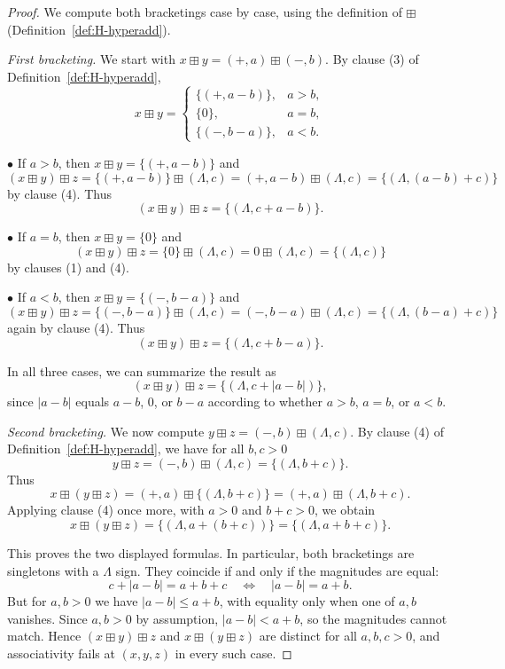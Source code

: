 \documentclass[11pt]{amsart}
\numberwithin{equation}{section}
\theoremstyle{definition}
\theoremstyle{remark}
\newcommand{\op}{\boxplus}                 %
\begin{document}
\begin{proof}
We compute both bracketings case by case, using the definition of $\op$
(Definition~\ref{def:H-hyperadd}).

\medskip\noindent
\emph{First bracketing.}
We start with $x\op y=(+,a)\op(-,b)$.  By clause (3) of
Definition~\ref{def:H-hyperadd},
\[
  x\op y
  =
  \begin{cases}
    \{(+,a-b)\}, & a>b,\\[2pt]
    \{0\},       & a=b,\\[2pt]
    \{(-,b-a)\}, & a<b.
  \end{cases}
\]

\smallskip
\noindent
$\bullet$ If $a>b$, then $x\op y=\{(+,a-b)\}$ and
\[
  (x\op y)\op z
  = \{(+,a-b)\}\op(\Lambda,c)
  = (+,a-b)\op(\Lambda,c)
  = \{(\Lambda,(a-b)+c)\}
\]
by clause (4).  Thus
\[
  (x\op y)\op z = \{(\Lambda,c+a-b)\}.
\]

\smallskip
\noindent
$\bullet$ If $a=b$, then $x\op y=\{0\}$ and
\[
  (x\op y)\op z
  = \{0\}\op(\Lambda,c)
  = 0\op(\Lambda,c)
  = \{(\Lambda,c)\}
\]
by clauses (1) and (4).

\smallskip
\noindent
$\bullet$ If $a<b$, then $x\op y=\{(-,b-a)\}$ and
\[
  (x\op y)\op z
  = \{(-,b-a)\}\op(\Lambda,c)
  = (-,b-a)\op(\Lambda,c)
  = \{(\Lambda,(b-a)+c)\}
\]
again by clause (4).  Thus
\[
  (x\op y)\op z
  = \{(\Lambda,c+b-a)\}.
\]

In all three cases, we can summarize the result as
\[
  (x\op y)\op z
  = \{(\Lambda,c+|a-b|)\},
\]
since $|a-b|$ equals $a-b$, $0$, or $b-a$ according to whether $a>b$,
$a=b$, or $a<b$.

\medskip\noindent
\emph{Second bracketing.}
We now compute $y\op z=(-,b)\op(\Lambda,c)$.  By clause (4) of
Definition~\ref{def:H-hyperadd}, we have for all $b,c>0$
\[
  y\op z = (-,b)\op(\Lambda,c) = \{(\Lambda,b+c)\}.
\]
Thus
\[
  x\op(y\op z)
  = (+,a)\op\{(\Lambda,b+c)\}
  = (+,a)\op(\Lambda,b+c).
\]
Applying clause (4) once more, with $a>0$ and $b+c>0$, we obtain
\[
  x\op(y\op z)
  = \{(\Lambda,a+(b+c))\}
  = \{(\Lambda,a+b+c)\}.
\]

\medskip
This proves the two displayed formulas.  In particular, both
bracketings are singletons with a $\Lambda$ sign.  They coincide if and
only if the magnitudes are equal:
\[
  c+|a-b| = a+b+c
  \quad\Longleftrightarrow\quad
  |a-b| = a+b.
\]
But for $a,b>0$ we have $|a-b|\le a+b$, with equality only when one of
$a,b$ vanishes.  Since $a,b>0$ by assumption, $|a-b|<a+b$, so the
magnitudes cannot match.  Hence $(x\op y)\op z$ and $x\op(y\op z)$ are
distinct for all $a,b,c>0$, and associativity fails at $(x,y,z)$ in
every such case.
\end{proof}
\end{document}
